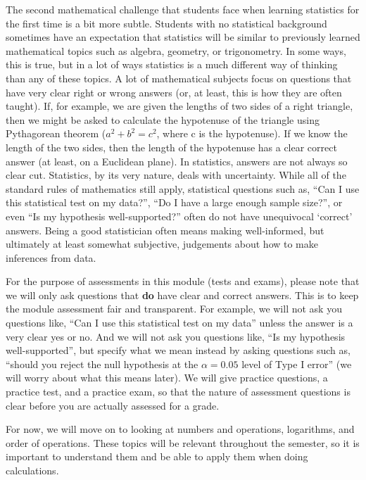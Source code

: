 \documentclass[
]{scrbook}
\begin{document}
The second mathematical challenge that students face when learning statistics for the first time is a bit more subtle.
Students with no statistical background sometimes have an expectation that statistics will be similar to previously learned mathematical topics such as algebra, geometry, or trigonometry.
In some ways, this is true, but in a lot of ways statistics is a much different way of thinking than any of these topics.
A lot of mathematical subjects focus on questions that have very clear right or wrong answers (or, at least, this is how they are often taught).
If, for example, we are given the lengths of two sides of a right triangle, then we might be asked to calculate the hypotenuse of the triangle using Pythagorean theorem (\(a^{2} + b^{2} = c^{2}\), where c is the hypotenuse).
If we know the length of the two sides, then the length of the hypotenuse has a clear correct answer (at least, on a Euclidean plane).
In statistics, answers are not always so clear cut.
Statistics, by its very nature, deals with uncertainty.
While all of the standard rules of mathematics still apply, statistical questions such as, ``Can I use this statistical test on my data?'', ``Do I have a large enough sample size?'', or even ``Is my hypothesis well-supported?'' often do not have unequivocal `correct' answers.
Being a good statistician often means making well-informed, but ultimately at least somewhat subjective, judgements about how to make inferences from data.

For the purpose of assessments in this module (tests and exams), please note that we will only ask questions that \textbf{do} have clear and correct answers.
This is to keep the module assessment fair and transparent.
For example, we will not ask you questions like, ``Can I use this statistical test on my data'' unless the answer is a very clear yes or no.
And we will not ask you questions like, ``Is my hypothesis well-supported'', but specify what we mean instead by asking questions such as, ``should you reject the null hypothesis at the \(\alpha = 0.05\) level of Type I error'' (we will worry about what this means later).
We will give practice questions, a practice test, and a practice exam, so that the nature of assessment questions is clear before you are actually assessed for a grade.

For now, we will move on to looking at numbers and operations, logarithms, and order of operations.
These topics will be relevant throughout the semester, so it is important to understand them and be able to apply them when doing calculations.
\end{document}
